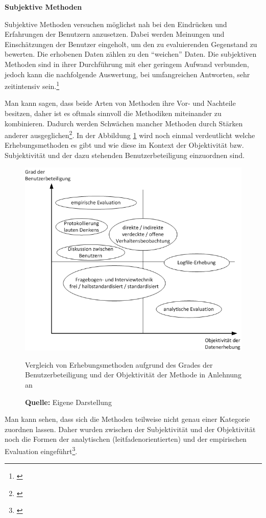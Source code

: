 \textbf{Subjektive Methoden}

Subjektive Methoden versuchen möglichst nah bei den Eindrücken und Erfahrungen der Benutzern anzusetzen. Dabei werden Meinungen und Einschätzungen der Benutzer eingeholt, um den zu evaluierenden Gegenstand zu bewerten. Die erhobenen Daten zählen zu den \enquote{weichen} Daten. Die subjektiven Methoden sind in ihrer Durchführung mit eher geringem Aufwand verbunden, jedoch kann die nachfolgende Auswertung, bei umfangreichen Antworten, sehr zeitintensiv sein.\footnote{\cite[vgl.][18]{Hegner2003}}

Man kann sagen, dass beide Arten von Methoden ihre Vor- und Nachteile besitzen, daher ist es oftmals sinnvoll die Methodiken miteinander zu kombinieren. Dadurch werden Schwächen mancher Methoden durch Stärken anderer ausgeglichen\footnote{\cite[vgl.][261]{Pruemper1997}}. In der Abbildung \ref{fig:erhebungsmethodenObjektivitaetBenutzerbeteiligung} wird noch einmal verdeutlicht welche Erhebungsmethoden es gibt und wie diese im Kontext der Objektivität bzw. Subjektivität und der dazu stehenden Benutzerbeteiligung einzuordnen sind.
\begin{figure}[H]
  \centering
  \includegraphics[scale=0.8]{img/Datenerhebungsmethoden_Objektivitaet_Benutzerbeteiligung.png}
  \caption{Vergleich von Erhebungsmethoden aufgrund des Grades der Benutzerbeteiligung und der Objektivität der Methode in Anlehnung an \citep[vgl.][16]{Hegner2003}}
  \caption*{\textbf{Quelle:} Eigene Darstellung}
  \label{fig:erhebungsmethodenObjektivitaetBenutzerbeteiligung}
\end{figure}
Man kann sehen, dass sich die Methoden teilweise nicht genau einer Kategorie zuordnen lassen. Daher wurden zwischen der Subjektivität und der Objektivität noch die Formen der analytischen (leitfadenorientierten) und der empirischen Evaluation eingeführt\footnote{\cite[vgl.][15]{Hegner2003}}.

